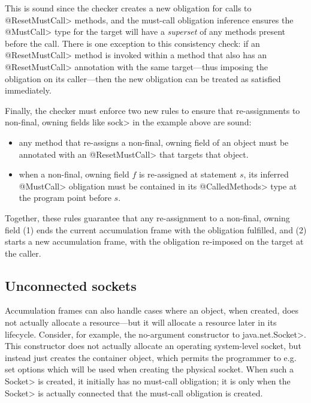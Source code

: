 This is sound since the checker creates a new obligation for calls to
\<@ResetMustCall> methods, and the must-call obligation inference ensures the
\<@MustCall> type for the target will have a \emph{superset} of any methods present
before the call.
There is one exception to this consistency check: if an \<@ResetMustCall>
method is invoked within a method that also has an \<@ResetMustCall> annotation
with the same target---thus imposing the obligation on its caller---then
the new obligation can be treated as satisfied immediately.

Finally, the checker must enforce two new rules to ensure that
re-assignments to non-final, owning fields like \<sock> in the example
above are sound:
\begin{itemize}
\item any method that re-assigns a non-final, owning field of an object
  must be annotated with an \<@ResetMustCall> that targets that object.
\item when a non-final, owning field $f$ is re-assigned at statement $s$, its inferred \<@MustCall> obligation
must be contained in its \<@CalledMethods> type at the program point before $s$.
\end{itemize}
\noindent
Together, these rules guarantee that any re-assignment to a non-final, owning
field (1) ends the current accumulation frame with the obligation fulfilled,
and (2) starts a new accumulation frame, with the obligation re-imposed on
the target at the caller.

\subsection{Unconnected sockets}
\label{sec:unconnected-sockets}
Accumulation frames can also handle cases where an object, when created,
does not actually allocate a resource---but it will allocate a resource
later in its lifecycle. Consider, for example, the no-argument constructor
to \<java.net.Socket>. This constructor does not actually allocate an
operating system-level socket, but instead just creates the container
object, which permits the programmer to e.g. set options which will be used
when creating the physical socket. When such a \<Socket> is created, it
initially has no must-call obligation; it is only when the \<Socket> is
actually connected that the must-call obligation is created.

